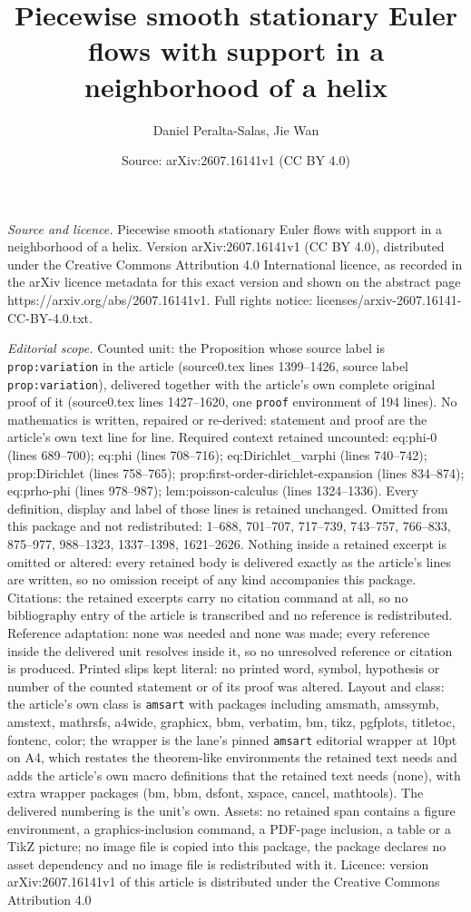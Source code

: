 \documentclass[10pt,a4paper]{amsart}
\title[Piecewise smooth stationary Euler flows with support in a ne]{Piecewise smooth stationary Euler flows with support in a neighborhood of a helix}
\author{Daniel Peralta-Salas, Jie Wan}
\date{Source: arXiv:2607.16141v1 (CC BY 4.0)}
\begin{document}
\maketitle

\noindent\emph{Source and licence.} Piecewise smooth stationary Euler flows with support in a neighborhood of a helix. Version arXiv:2607.16141v1 (CC BY 4.0), distributed under the Creative Commons Attribution 4.0 International licence, as recorded in the arXiv licence metadata for this exact version and shown on the abstract page https://arxiv.org/abs/2607.16141v1. Full rights notice: licenses/arxiv-2607.16141-CC-BY-4.0.txt.\par\smallskip

\noindent\textit{Editorial scope.} Counted unit: the Proposition whose source label is \texttt{prop:variation} in the article (source0.tex lines 1399--1426, source label \texttt{prop:variation}), delivered together with the article's own complete original proof of it (source0.tex lines 1427--1620, one \texttt{proof} environment of 194 lines). No mathematics is written, repaired or re-derived: statement and proof are the article's own text line for line. Required context retained uncounted: eq:phi-0 (lines 689--700); eq:phi (lines 708--716); eq:Dirichlet\_varphi (lines 740--742); prop:Dirichlet (lines 758--765); prop:first-order-dirichlet-expansion (lines 834--874); eq:prho-phi (lines 978--987); lem:poisson-calculus (lines 1324--1336). Every definition, display and label of those lines is retained unchanged. Omitted from this package and not redistributed: 1--688, 701--707, 717--739, 743--757, 766--833, 875--977, 988--1323, 1337--1398, 1621--2626. Nothing inside a retained excerpt is omitted or altered: every retained body is delivered exactly as the article's lines are written, so no omission receipt of any kind accompanies this package. Citations: the retained excerpts carry no citation command at all, so no bibliography entry of the article is transcribed and no reference is redistributed. Reference adaptation: none was needed and none was made; every reference inside the delivered unit resolves inside it, so no unresolved reference or citation is produced. Printed slips kept literal: no printed word, symbol, hypothesis or number of the counted statement or of its proof was altered. Layout and class: the article's own class is \texttt{amsart} with packages including amsmath, amssymb, amstext, mathrsfs, a4wide, graphicx, bbm, verbatim, bm, tikz, pgfplots, titletoc, fontenc, color; the wrapper is the lane's pinned \texttt{amsart} editorial wrapper at 10pt on A4, which restates the theorem-like environments the retained text needs and adds the article's own macro definitions that the retained text needs (none), with extra wrapper packages (bm, bbm, dsfont, xspace, cancel, mathtools). The delivered numbering is the unit's own. Assets: no retained span contains a figure environment, a graphics-inclusion command, a PDF-page inclusion, a table or a TikZ picture; no image file is copied into this package, the package declares no asset dependency and no image file is redistributed with it. Licence: version arXiv:2607.16141v1 of this article is distributed under the Creative Commons Attribution 4.0 
\end{document}
